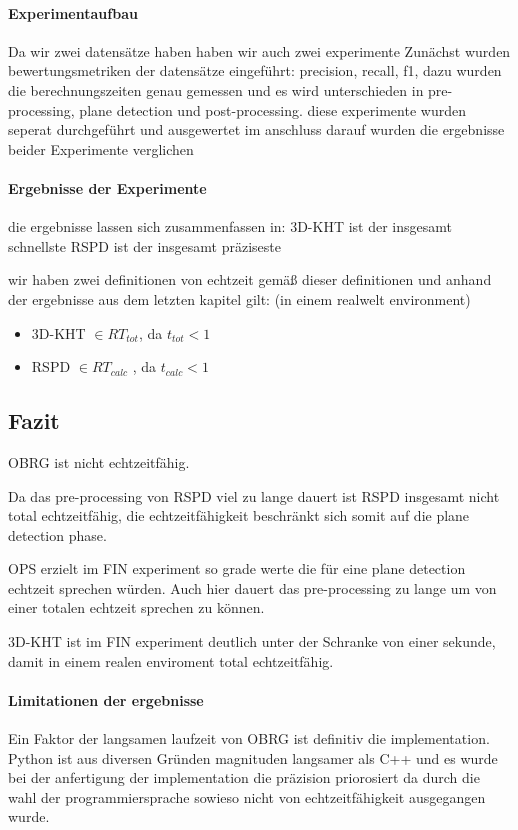 \documentclass[main.tex]{subfiles}
\begin{document}
\paragraph{Experimentaufbau}
Da wir zwei datensätze haben haben wir auch zwei experimente
Zunächst wurden bewertungsmetriken der datensätze eingeführt:
precision, recall, f1, 
dazu wurden die berechnungszeiten genau gemessen und es wird unterschieden in pre-processing,
plane detection und post-processing. 
diese experimente wurden seperat durchgeführt und ausgewertet
im anschluss darauf wurden die ergebnisse beider Experimente verglichen

\paragraph{Ergebnisse der Experimente }
die ergebnisse lassen sich zusammenfassen in:
3D-KHT ist der insgesamt schnellste
RSPD ist der insgesamt präziseste
 
wir haben zwei definitionen von echtzeit
gemäß dieser definitionen und anhand der ergebnisse aus dem letzten kapitel gilt:
(in einem realwelt environment)
\begin{itemize}
    \item 3D-KHT $\in RT_{tot}$, da $t_{tot} < 1$
    \item RSPD $\in RT_{calc}$ , da $t_{calc}< 1$
\end{itemize}

\subsection{Fazit}

OBRG ist nicht echtzeitfähig.

Da das pre-processing von RSPD viel zu lange dauert ist RSPD insgesamt nicht total echtzeitfähig,
die echtzeitfähigkeit beschränkt sich somit auf die plane detection phase.

OPS erzielt im FIN experiment so grade werte die für eine plane detection echtzeit sprechen würden.
Auch hier dauert das pre-processing zu lange um von einer totalen echtzeit sprechen zu können.

3D-KHT ist im FIN experiment deutlich unter der Schranke von einer sekunde, damit in einem realen 
enviroment total echtzeitfähig. 


\paragraph{Limitationen der ergebnisse}
Ein Faktor der langsamen laufzeit von OBRG ist definitiv die implementation. Python ist aus diversen
Gründen magnituden langsamer als C++ und es wurde bei der anfertigung der implementation die 
präzision priorosiert da durch die wahl der programmiersprache sowieso nicht von echtzeitfähigkeit 
ausgegangen wurde.
\end{document}
